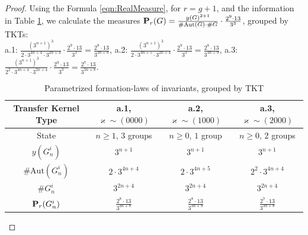 \documentclass[10pt,a4paper]{amsart}
\begin{document}
\begin{proof}
Using the Formula
\eqref{eqn:RealMeasure},
for \(r=g+1\),
and the information in Table
\ref{tbl:FormationLawsOne},
we calculate the measures
\({\bf P}_r(G)=\frac{y(G)^{2+1}}{\#\mathrm{Aut}(G)\cdot\#G}\cdot\frac{2^9\cdot 13}{3^3}\), grouped by TKTs: \\
a.1: \(\frac{(3^{n+1})^3}{2\cdot 3^{4n+4}\cdot 3^{2n+4}}\cdot\frac{2^9\cdot 13}{3^3}=\frac{2^8\cdot 13}{3^{3n+8}}\),
a.2: \(\frac{(3^{n+1})^3}{2\cdot 3^{4n+5}\cdot 3^{2n+4}}\cdot\frac{2^9\cdot 13}{3^3}=\frac{2^8\cdot 13}{3^{3n+9}}\),
a.3: \(\frac{(3^{n+1})^3}{2^2\cdot 3^{4n+4}\cdot 3^{2n+4}}\cdot\frac{2^9\cdot 13}{3^3}=\frac{2^7\cdot 13}{3^{3n+8}}\).

\renewcommand{\arraystretch}{1.2}
\begin{table}[ht]
\caption{Parametrized formation-laws of invariants, grouped by TKT}
\label{tbl:FormationLawsOne}
\begin{center}
\begin{tabular}{|c||c|c|c|}
\hline
 Transfer Kernel Type      & a.1, \(\varkappa\sim (0000)\)    &  a.2, \(\varkappa\sim (1000)\)   &  a.3, \(\varkappa\sim (2000)\)   \\
\hline
 State                     & \(n\ge 1\), \(3\) groups         & \(n\ge 0\), \(1\) group          & \(n\ge 0\), \(2\) groups         \\
 \(y(G_n^i)\)              & \(3^{n+1}\)                      & \(3^{n+1}\)                      & \(3^{n+1}\)                      \\
 \(\#\mathrm{Aut}(G_n^i)\) & \(2\cdot 3^{4n+4}\)              & \(2\cdot 3^{4n+5}\)              & \(2^2\cdot 3^{4n+4}\)            \\
 \(\#G_n^i\)               & \(3^{2n+4}\)                     & \(3^{2n+4}\)                     & \(3^{2n+4}\)                     \\
 \({\bf P}_r(G_n^i)\)      & \(\frac{2^8\cdot 13}{3^{3n+8}}\) & \(\frac{2^8\cdot 13}{3^{3n+9}}\) & \(\frac{2^7\cdot 13}{3^{3n+8}}\) \\
\hline
\end{tabular}
\end{center}
\end{table}


\end{proof}
\end{document}
